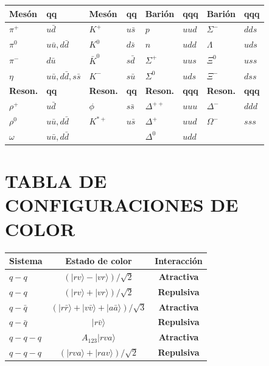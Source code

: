 {
\centering
\begin{tabular}{|l|l|l|l||l|l|l|l|}
\hline
\textbf{Mesón} & \textbf{qq} & \textbf{Mesón} & \textbf{qq} & \textbf{Barión} & \textbf{qqq} & \textbf{Barión} & \textbf{qqq} \\ \hline
$\pi^+$ & $u\bar{d}$ & $K^+$ & $u\bar{s}$ & $p$ & $uud$ & $\Sigma^-$ & $dds$ \\ \hline
$\pi^0$ & $u\bar{u}, d\bar{d}$ & $K^0$ & $d\bar{s}$ & $n$ & $udd$ & $\Lambda$ & $uds$ \\ \hline
$\pi^-$ & $d\bar{u}$ & $\bar{K}^0$ & $s\bar{d}$ & $\Sigma^+$ & $uus$ & $\Xi^0$ & $uss$ \\ \hline
$\eta$ & $u\bar{u}, d\bar{d}, s\bar{s}$ & $K^-$ & $s\bar{u}$ & $\Sigma^0$ & $uds$ & $\Xi^-$ & $dss$ \\ \hline
\hline
\textbf{Reson.} & \textbf{qq} & \textbf{Reson.} & \textbf{qq} & \textbf{Reson.} & \textbf{qqq} & \textbf{Reson.} & \textbf{qqq} \\ \hline
$\rho^+$ & $u\bar{d}$ & $\phi$ & $s\bar{s}$ & $\Delta^{++}$ & $uuu$ & $\Delta^-$ & $ddd$ \\ \hline
$\rho^0$ & $u\bar{u}, d\bar{d}$ & $K^{*+}$ & $u\bar{s}$ & $\Delta^+$ & $uud$ & $\Omega^-$ & $sss$ \\ \hline
$\omega$ & $u\bar{u}, d\bar{d}$ & & & $\Delta^0$ & $udd$ & & \\ \hline
\end{tabular}

}


\section{TABLA DE CONFIGURACIONES DE COLOR}
{
\centering
\begin{center}
\begin{tabular}{|l|c|c|}
\hline
\textbf{Sistema} & \textbf{Estado de color} & \textbf{Interacción} \\ \hline
$q - q$ & $(|rv\rangle - |vr\rangle)/\sqrt{2}$ & \textbf{Atractiva} \\ \hline
$q - q$ & $(|rv\rangle + |vr\rangle)/\sqrt{2}$ & \textbf{Repulsiva} \\ \hline
$q - \bar{q}$ & $(|r\bar{r}\rangle + |v\bar{v}\rangle + |a\bar{a}\rangle)/\sqrt{3}$ & \textbf{Atractiva} \\ \hline
$q - \bar{q}$ & $|r\bar{v}\rangle$ & \textbf{Repulsiva} \\ \hline
$q - q - q$ & $A_{123}|rva\rangle$ & \textbf{Atractiva} \\ \hline
$q - q - q$ & $(|rva\rangle + |rav\rangle)/\sqrt{2}$ & \textbf{Repulsiva} \\ \hline
\end{tabular}
\end{center}

}
